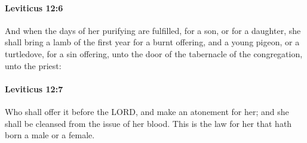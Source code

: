 		\paragraph{Leviticus 12:6} %
			\label{LEVITICUS-12-6}

			And when the days of her purifying are fulfilled, for a son, or for a daughter, she shall bring a lamb of the first year for a burnt offering, and a young pigeon, or a turtledove, for a sin offering, unto the door of the tabernacle of the congregation, unto the priest:


		\paragraph{Leviticus 12:7} %
			\label{LEVITICUS-12-7}

			Who shall offer it before the LORD, and make an atonement for her; and she shall be cleansed from the issue of her blood. This is the law for her that hath born a male or a female.

